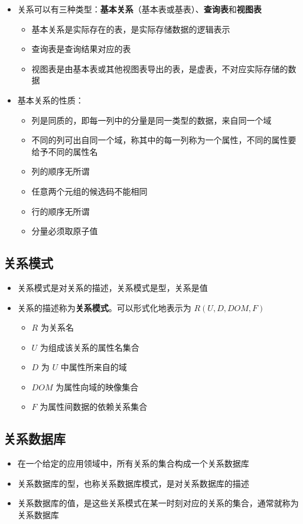 \begin{itemize}
\begin{itemize}
    \end{itemize}
    \item 关系可以有三种类型：\textbf{基本关系}（基本表或基表）、\textbf{查询表}和\textbf{视图表}
    \begin{itemize}
        \item 基本关系是实际存在的表，是实际存储数据的逻辑表示
        \item 查询表是查询结果对应的表
        \item 视图表是由基本表或其他视图表导出的表，是虚表，不对应实际存储的数据
    \end{itemize}
    \item 基本关系的性质：
    \begin{itemize}
        \item 列是同质的，即每一列中的分量是同一类型的数据，来自同一个域
        \item 不同的列可出自同一个域，称其中的每一列称为一个属性，不同的属性要给予不同的属性名
        \item 列的顺序无所谓
        \item 任意两个元组的候选码不能相同
        \item 行的顺序无所谓
        \item 分量必须取原子值
    \end{itemize}
\end{itemize}

\subsection{关系模式}
\begin{itemize}
    \item 关系模式是对关系的描述，关系模式是型，关系是值
    \item 关系的描述称为\textbf{关系模式}。可以形式化地表示为 $R(U,D,DOM,F)$
    \begin{itemize}
        \item $R$ 为关系名
        \item $U$ 为组成该关系的属性名集合
        \item $D$ 为 $U$ 中属性所来自的域
        \item $DOM$ 为属性向域的映像集合
        \item $F$ 为属性间数据的依赖关系集合
    \end{itemize}
\end{itemize}

\subsection{关系数据库}
\begin{itemize}
    \item 在一个给定的应用领域中，所有关系的集合构成一个关系数据库
    \item 关系数据库的型，也称关系数据库模式，是对关系数据库的描述
    \item 关系数据库的值，是这些关系模式在某一时刻对应的关系的集合，通常就称为关系数据库
\end{itemize}

